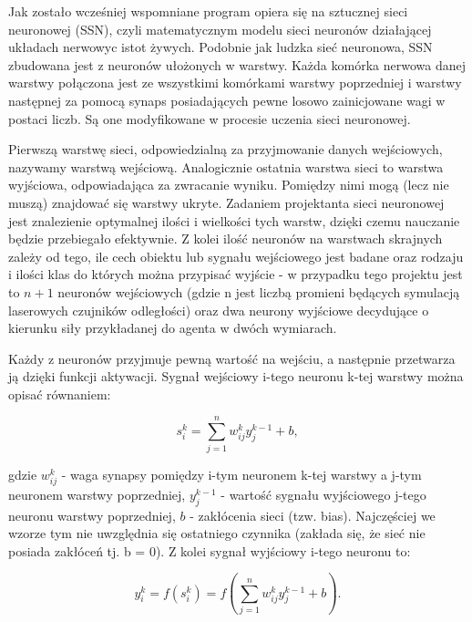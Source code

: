 \documentclass[12pt,a4paper]{article}
\begin{document}
\hspace{20pt} Jak zostało wcześniej wspomniane program opiera się na sztucznej sieci neuronowej (SSN), czyli matematycznym modelu sieci neuronów działającej układach nerwowyc istot żywych. Podobnie jak ludzka sieć neuronowa, SSN zbudowana jest z neuronów ułożonych w warstwy. Każda komórka nerwowa danej warstwy połączona jest ze wszystkimi komórkami warstwy poprzedniej i warstwy następnej za pomocą synaps posiadających pewne losowo zainicjowane wagi w postaci liczb. Są one modyfikowane w procesie uczenia sieci neuronowej.

\vspace{5pt}
Pierwszą warstwę sieci, odpowiedzialną za przyjmowanie danych wejściowych, nazywamy warstwą wejściową. Analogicznie ostatnia warstwa sieci to warstwa wyjściowa, odpowiadająca za zwracanie wyniku. Pomiędzy nimi mogą (lecz nie muszą) znajdować się warstwy ukryte. Zadaniem projektanta sieci neuronowej jest znalezienie optymalnej ilości i wielkości tych warstw, dzięki czemu nauczanie będzie przebiegało efektywnie. Z kolei ilość neuronów na warstwach skrajnych zależy od tego, ile cech obiektu lub sygnału wejściowego jest badane oraz rodzaju i ilości klas do których można przypisać wyjście - w przypadku tego projektu jest to $n+1$ neuronów wejściowych (gdzie n jest liczbą promieni będących symulacją laserowych czujników odległości) oraz dwa neurony wyjściowe decydujące o kierunku siły przykładanej do agenta w dwóch wymiarach.

\vspace{5pt}
Każdy z neuronów przyjmuje pewną wartość na wejściu, a następnie przetwarza ją dzięki funkcji aktywacji. Sygnał wejściowy i-tego neuronu k-tej warstwy można opisać równaniem:

\begin{equation*}
    s^k_i = \sum_{j=1}^{n}w^k_{ij} y^{k-1}_{j} + b,
\end{equation*}

\noindent gdzie $w^k_{ij}$ - waga synapsy pomiędzy i-tym neuronem k-tej warstwy a j-tym neuronem warstwy poprzedniej, $y^{k-1}_{j}$ - wartość sygnału wyjściowego j-tego neuronu warstwy poprzedniej, $b$ - zakłócenia sieci (tzw. bias). Najczęściej we wzorze tym nie uwzględnia się ostatniego czynnika (zakłada się, że sieć nie posiada zakłóceń tj. b = 0). Z kolei sygnał wyjściowy i-tego neuronu to:

\begin{equation*}
    y^k_i = f(s^k_i) = f(\sum_{j=1}^{n}w^k_{ij} y^{k-1}_{j} + b).
\end{equation*}
\end{document}
